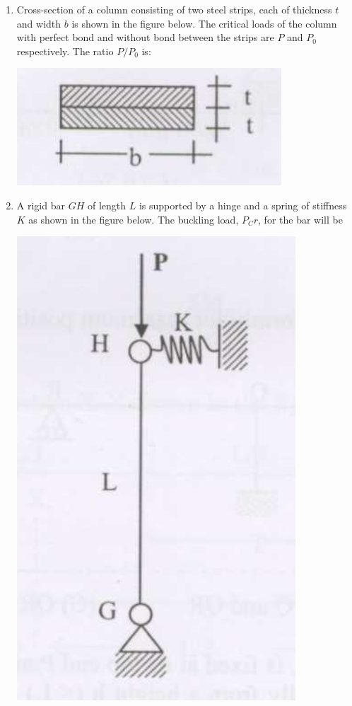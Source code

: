 \documentclass[journal]{IEEEtran}
\begin{document}
\begin{enumerate}
\item Cross-section of a column consisting of two steel strips, each of thickness $t$ and width $b$ is shown in the figure below. The critical loads of the column with perfect bond and without bond between the strips are $P$ and $P_0$ respectively. The ratio $P/P_0$ is: \hfill {}
\vspace{0.1cm}

\includegraphics[width=\columnwidth]{figs/fig14.png} 

\begin{enumerate}
\end{enumerate}

\item A rigid bar $GH$ of length $L$ is supported by a hinge and a spring of stiffness $K$ as shown in the figure below. The buckling load, $P_Cr$, for the bar will be  \hfill {}



\includegraphics[width=0.3\columnwidth]{figs/fig15.png}



\end{enumerate}
\end{document}
